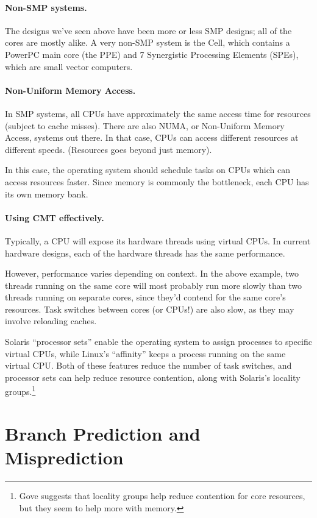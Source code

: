 \documentclass[a4paper]{report}
\begin{document}
\paragraph{Non-SMP systems.} The designs we've seen above have been
more or less SMP designs; all of the cores are mostly alike.
A very non-SMP system is the Cell, which contains a PowerPC main core
(the PPE) and 7 Synergistic Processing Elements (SPEs), which are
small vector computers.


\paragraph{Non-Uniform Memory Access.}
In SMP systems, all CPUs have approximately the same access time for resources
(subject to cache misses). There are also NUMA, or Non-Uniform Memory Access,
systems out there. In that case, CPUs can access different resources at different
speeds. (Resources goes beyond just memory).

In this case, the operating system should schedule tasks on CPUs which
can access resources faster.  Since memory is commonly the bottleneck,
each CPU has its own memory bank.

\paragraph{Using CMT effectively.} Typically, a CPU will expose its
hardware threads using virtual CPUs.
In current hardware designs, each of the hardware threads has the same
performance. 

However, performance varies depending on context. In the above
example, two threads running on the same core will most probably run
more slowly than two threads running on separate cores, since they'd
contend for the same core's resources. Task switches between cores (or
CPUs!) are also slow, as they may involve reloading caches.

Solaris ``processor sets''
enable the operating system to assign processes to specific virtual CPUs,
while Linux's ``affinity'' keeps a process running on the same virtual CPU.
Both of these features reduce the number of task switches, and processor
sets can help reduce resource contention, along with Solaris's locality
groups.\footnote{Gove suggests that locality groups help reduce contention
for core resources, but they seem to help more with memory.}



\section*{Branch Prediction and Misprediction}
\end{document}
